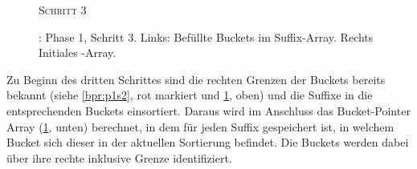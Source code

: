 \begin{figure}[H]
    {\centering\begin{minipage}{\textwidth}
        {\large \textsc{Schritt 3}}\par\medskip
    \end{minipage}}
    \caption[\bpr: Phase 1, Schritt 3]{\bpr: Phase 1, Schritt 3. Links: Befüllte Buckets im Suffix-Array. Rechts Initiales \bptr-Array.}
    \label{bpr:p1s3}
\end{figure}
Zu Beginn des dritten Schrittes sind die rechten Grenzen der Buckets bereits bekannt (siehe \cref{bpr:p1s2}, rot markiert und \cref{bpr:p1s3}, oben) und die Suffixe in die entsprechenden Buckets einsortiert. Daraus wird im Anschluss das Bucket-Pointer Array (\cref{bpr:p1s3}, unten) berechnet, in dem für jeden Suffix gespeichert ist, in welchem Bucket sich dieser in der aktuellen Sortierung befindet. Die Buckets werden dabei über ihre rechte inklusive Grenze identifiziert.\par
